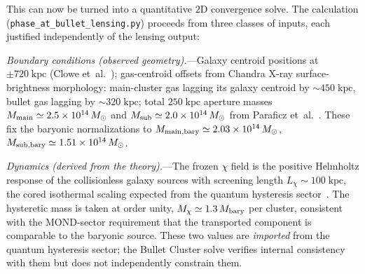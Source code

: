 \documentclass[11pt]{article}
\begin{document}
This can now be turned into a quantitative $2$D convergence
solve.  The calculation
(\nolinkurl{phase_at_bullet_lensing.py})
proceeds from three classes of inputs, each justified
independently of the lensing output:

\textit{Boundary conditions (observed geometry).}---Galaxy
centroid positions at $\pm720\;\mathrm{kpc}$
(Clowe et~al.~\cite{Clowe2006}); gas-centroid offsets from
Chandra X-ray surface-brightness morphology: main-cluster gas
lagging its galaxy centroid by $\sim450\;\mathrm{kpc}$, bullet
gas lagging by $\sim320\;\mathrm{kpc}$; total
$250\;\mathrm{kpc}$ aperture
masses $M_{\rm main}\simeq2.5\times10^{14}\,M_\odot$ and
$M_{\rm sub}\simeq2.0\times10^{14}\,M_\odot$ from Paraficz
et~al.~\cite{Paraficz2016}.  These fix the baryonic
normalizations to
$M_{\rm main,bary}\simeq2.03\times10^{14}\,M_\odot$,
$M_{\rm sub,bary}\simeq1.51\times10^{14}\,M_\odot$.

\textit{Dynamics (derived from the theory).}---The frozen
$\chi$ field is the positive Helmholtz response of the
collisionless galaxy sources with screening length
$L_\chi\sim100\;\mathrm{kpc}$, the cored isothermal scaling
expected from the quantum hysteresis
sector~\cite{Lotishvili2026Q}.  The hysteretic mass is taken
at order unity, $M_\chi\simeq1.3\,M_{\rm bary}$ per cluster,
consistent with the MOND-sector requirement that the
transported component is comparable to the baryonic source.
These two values are \emph{imported} from the quantum
hysteresis sector; the Bullet Cluster solve verifies
internal consistency with them but does not independently
constrain them.
\end{document}
